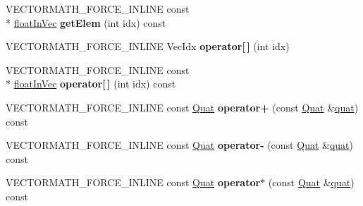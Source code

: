 \begin{DoxyCompactItemize}
\item 
\hypertarget{class_vectormath_1_1_aos_1_1_quat_ad82109219be5327b88d6d58c1991a885}{V\+E\+C\+T\+O\+R\+M\+A\+T\+H\+\_\+\+F\+O\+R\+C\+E\+\_\+\+I\+N\+L\+I\+N\+E const \\*
\hyperlink{class_vectormath_1_1float_in_vec}{float\+In\+Vec} {\bfseries get\+Elem} (int idx) const }\label{class_vectormath_1_1_aos_1_1_quat_ad82109219be5327b88d6d58c1991a885}

\item 
\hypertarget{class_vectormath_1_1_aos_1_1_quat_a5db86568489c304ce41351d8f4f4533c}{V\+E\+C\+T\+O\+R\+M\+A\+T\+H\+\_\+\+F\+O\+R\+C\+E\+\_\+\+I\+N\+L\+I\+N\+E Vec\+Idx {\bfseries operator\mbox{[}$\,$\mbox{]}} (int idx)}\label{class_vectormath_1_1_aos_1_1_quat_a5db86568489c304ce41351d8f4f4533c}

\item 
\hypertarget{class_vectormath_1_1_aos_1_1_quat_a0320323a37bb698e4655077718c65839}{V\+E\+C\+T\+O\+R\+M\+A\+T\+H\+\_\+\+F\+O\+R\+C\+E\+\_\+\+I\+N\+L\+I\+N\+E const \\*
\hyperlink{class_vectormath_1_1float_in_vec}{float\+In\+Vec} {\bfseries operator\mbox{[}$\,$\mbox{]}} (int idx) const }\label{class_vectormath_1_1_aos_1_1_quat_a0320323a37bb698e4655077718c65839}

\item 
\hypertarget{class_vectormath_1_1_aos_1_1_quat_ac90dd8d620ec6a53c210080ba3c71a35}{V\+E\+C\+T\+O\+R\+M\+A\+T\+H\+\_\+\+F\+O\+R\+C\+E\+\_\+\+I\+N\+L\+I\+N\+E const \hyperlink{class_vectormath_1_1_aos_1_1_quat}{Quat} {\bfseries operator+} (const \hyperlink{class_vectormath_1_1_aos_1_1_quat}{Quat} \&\hyperlink{classquat}{quat}) const }\label{class_vectormath_1_1_aos_1_1_quat_ac90dd8d620ec6a53c210080ba3c71a35}

\item 
\hypertarget{class_vectormath_1_1_aos_1_1_quat_ad608b8c2640a0343fcac8e3ecccb629f}{V\+E\+C\+T\+O\+R\+M\+A\+T\+H\+\_\+\+F\+O\+R\+C\+E\+\_\+\+I\+N\+L\+I\+N\+E const \hyperlink{class_vectormath_1_1_aos_1_1_quat}{Quat} {\bfseries operator-\/} (const \hyperlink{class_vectormath_1_1_aos_1_1_quat}{Quat} \&\hyperlink{classquat}{quat}) const }\label{class_vectormath_1_1_aos_1_1_quat_ad608b8c2640a0343fcac8e3ecccb629f}

\item 
\hypertarget{class_vectormath_1_1_aos_1_1_quat_ae2e3b5a410f29efb16d5f02431b50c64}{V\+E\+C\+T\+O\+R\+M\+A\+T\+H\+\_\+\+F\+O\+R\+C\+E\+\_\+\+I\+N\+L\+I\+N\+E const \hyperlink{class_vectormath_1_1_aos_1_1_quat}{Quat} {\bfseries operator$\ast$} (const \hyperlink{class_vectormath_1_1_aos_1_1_quat}{Quat} \&\hyperlink{classquat}{quat}) const }\label{class_vectormath_1_1_aos_1_1_quat_ae2e3b5a410f29efb16d5f02431b50c64}


\end{DoxyCompactItemize}
